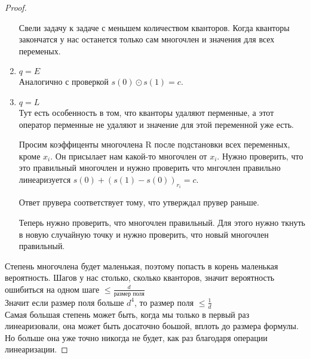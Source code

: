 \begin{proof}
\begin{enumerate}
        Свели задачу к задаче с меньшем количеством кванторов.
        Когда кванторы закончатся у нас останется
        только сам многочлен и значения для всех переменых.  
\item $q = E$\\
        Аналогично с проверкой $s(0) \odot s(1) = c$. 
\item $q = L$\\
       Тут есть особенность в том, что кванторы
       удаляют перменные, а этот оператор перменные не
       удаляют и значение для этой переменной уже есть.

       Просим коэффиценты многочлена R после подстановки всех
       переменных, кроме $x_i$. Он присылает нам какой-то 
       многочлен от $x_i$. Нужно проверить, что
       это правильный многочлен и нужно проверить что
       мнгочлен правильно линеаризуется $s(0) + (s(1) - s(0))_{r_i} = c$. 

       Ответ прувера соответствует тому, что утверждал прувер раньше.

      Теперь нужно проверить, что многочлен правильный. Для этого нужно
      ткнуть в новую случайную точку и нужно проверить, что новый многочлен
      правильный.  
                    
\end{enumerate}
Степень многочлена будет маленькая, 
поэтому попасть в корень маленькая вероятность. Шагов 
у нас столько, сколько кванторов, 
значит вероятность ошибиться на одном шаге $\le \frac{d}{\text{размер поля}}$\\

Значит если размер поля больше $d^4$, то размер поля $\le \frac{1}{d}$\\


Самая большая степень может быть, когда мы только в первый раз линеаризовали, 
она может быть досаточно боьшой, вплоть до размера формулы. Но больше она уже 
точно никогда не будет, как раз благодаря операции 
линеаризации. 

\end{proof}

